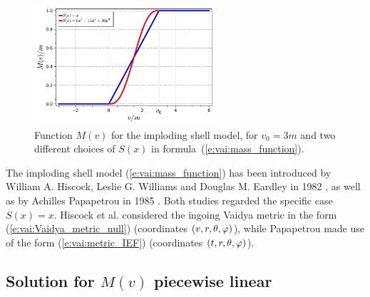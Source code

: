\begin{figure}
\centerline{\includegraphics[width=0.6\textwidth]{vai_mass_function.pdf}}
\caption[]{\label{f:vai:mass_function} \footnotesize
Function $M(v)$ for the imploding shell model, for $v_0 = 3 m$ and
two different choices of $S(x)$ in formula~(\ref{e:vai:mass_function}).
}
\end{figure}

\begin{hist}
The imploding shell model (\ref{e:vai:mass_function})
has been introduced by William A. Hiscock, Leslie G. Williams and Douglas M. Eardley in 1982 \cite{HiscoWE82},
as well as by Achilles Papapetrou in 1985 \cite{Papap85}.
Both studies regarded the specific case $S(x) = x$. Hiscock et al. considered
the ingoing Vaidya metric in the form (\ref{e:vai:Vaidya_metric_null}) (coordinates $(v, r, \theta, \varphi)$),
while Papapetrou made use of the form (\ref{e:vai:metric_IEF}) (coordinates $(t, r, \theta,\varphi)$).
\end{hist}

\subsection{Solution for $M(v)$ piecewise linear} \label{s:vai:sol_M_linear}

